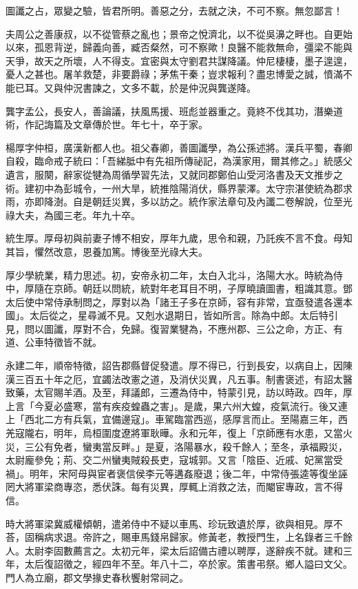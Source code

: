\begin{pinyinscope}
圖讖之占，眾變之驗，皆君所明。善惡之分，去就之決，不可不察。無忽鄙言！

夫周公之善康叔，以不從管蔡之亂也；景帝之悅濟北，以不從吳濞之畔也。自更始以來，孤恩背逆，歸義向善，臧否粲然，可不察歟！良醫不能救無命，彊梁不能與天爭，故天之所壞，人不得支。宜密與太守劉君共謀降議。仲尼棲棲，墨子遑遑，憂人之甚也。屠羊救楚，非要爵祿；茅焦干秦；豈求報利？盡忠博愛之誠，憤滿不能已耳。又與仲況書諫之，文多不載，於是仲況與龔遂降。

龔字孟公，長安人，善論議，扶風馬援、班彪並器重之。竟終不伐其功，潛樂道術，作記誨篇及文章傳於世。年七十，卒于家。

楊厚字仲桓，廣漢新都人也。祖父春卿，善圖讖學，為公孫述將。漢兵平蜀，春卿自殺，臨命戒子統曰：「吾綈胝中有先祖所傳祕記，為漢家用，爾其修之。」統感父遺言，服闋，辭家從犍為周循學習先法，又就同郡鄭伯山受河洛書及天文推步之術。建初中為彭城令，一州大旱，統推陰陽消伏，縣界蒙澤。太守宗湛使統為郡求雨，亦即降澍。自是朝廷災異，多以訪之。統作家法章句及內讖二卷解說，位至光祿大夫，為國三老。年九十卒。

統生厚。厚母初與前妻子博不相安，厚年九歲，思令和親，乃託疾不言不食。母知其旨，懼然改意，恩養加篤。博後至光祿大夫。

厚少學統業，精力思述。初，安帝永初二年，太白入北斗，洛陽大水。時統為侍中，厚隨在京師。朝廷以問統，統對年老耳目不明，子厚曉讀圖書，粗識其意。鄧太后使中常侍承制問之，厚對以為「諸王子多在京師，容有非常，宜亟發遣各還本國」。太后從之，星尋滅不見。又剋水退期日，皆如所言。除為中郎。太后特引見，問以圖讖，厚對不合，免歸。復習業犍為，不應州郡、三公之命，方正、有道、公車特徵皆不就。

永建二年，順帝特徵，詔告郡縣督促發遣。厚不得已，行到長安，以病自上，因陳漢三百五十年之厄，宜蠲法改憲之道，及消伏災異，凡五事。制書褒述，有詔太醫致藥，太官賜羊酒。及至，拜議郎，三遷為侍中，特蒙引見，訪以時政。四年，厚上言「今夏必盛寒，當有疾疫蝗蟲之害」。是歲，果六州大蝗，疫氣流行。後又連上「西北二方有兵氣，宜備邊寇」。車駕臨當西巡，感厚言而止。至陽嘉三年，西羌寇隴右，明年，烏桓圍度遼將軍耿曄。永和元年，復上「京師應有水患，又當火災，三公有免者，蠻夷當反畔。」是夏，洛陽暴水，殺千餘人；至冬，承福殿災，太尉龐參免；荊、交二州蠻夷賊殺長吏，寇城郭。又言「陰臣、近戚、妃黨當受禍」。明年，宋阿母與宦者褒信侯李元等遘姦廢退；後二年，中常侍張逵等復坐誣罔大將軍梁商專恣，悉伏誅。每有災異，厚輒上消救之法，而閹宦專政，言不得信。

時大將軍梁冀威權傾朝，遣弟侍中不疑以車馬、珍玩致遺於厚，欲與相見。厚不荅，固稱病求退。帝許之，賜車馬錢帛歸家。修黃老，教授門生，上名錄者三千餘人。太尉李固數薦言之。太初元年，梁太后詔備古禮以聘厚，遂辭疾不就。建和三年，太后復詔徵之，經四年不至。年八十二，卒於家。策書弔祭。鄉人謚曰文父。門人為立廟，郡文學掾史春秋饗射常祠之。


\end{pinyinscope}